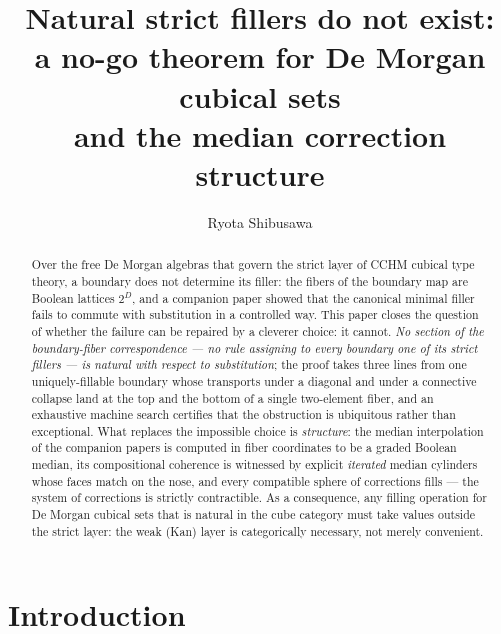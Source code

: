 \documentclass[11pt]{amsart}
\theoremstyle{definition}
\begin{document}
\title[Natural strict fillers do not exist]{Natural strict fillers
  do not exist:\\ a no-go theorem for De Morgan cubical sets\\ and
  the median correction structure}

\author{Ryota Shibusawa}
\address{Daiichi Institute of Technology, Japan}


\begin{abstract}
  Over the free De Morgan algebras that govern the strict layer of
  CCHM cubical type theory, a boundary does not determine its
  filler: the fibers of the boundary map are Boolean lattices
  $2^{D}$, and a companion paper showed that the canonical minimal
  filler fails to commute with substitution in a controlled way.
  This paper closes the question of whether the failure can be
  repaired by a cleverer choice: it cannot.  \emph{No section of
  the boundary-fiber correspondence --- no rule assigning to every
  boundary one of its strict fillers --- is natural with respect to
  substitution}; the proof takes three lines from one
  uniquely-fillable boundary whose transports under a diagonal and
  under a connective collapse land at the top and the bottom of a
  single two-element fiber, and an exhaustive machine search
  certifies that the obstruction is ubiquitous rather than
  exceptional.  What replaces the impossible choice is
  \emph{structure}: the median interpolation of the companion
  papers is computed in fiber coordinates to be a graded Boolean
  median, its compositional coherence is witnessed by explicit
  \emph{iterated} median cylinders whose faces match on the nose,
  and every compatible sphere of corrections fills --- the system of
  corrections is strictly contractible.  As a consequence, any
  filling operation for De Morgan cubical sets that is natural in
  the cube category must take values outside the strict layer: the
  weak (Kan) layer is categorically necessary, not merely
  convenient.
\end{abstract}

\maketitle

\section{Introduction}
\label{sec:intro}
\end{document}
